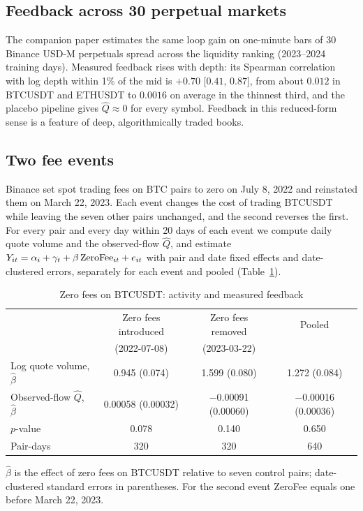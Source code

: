 \documentclass[12pt]{article}
\theoremstyle{definition}
\theoremstyle{remark}
\begin{document}
\subsection{Feedback across 30 perpetual markets}

The companion paper estimates the same loop gain on one-minute bars of 30 Binance USD-M perpetuals spread across the liquidity ranking (2023--2024 training days). Measured feedback rises with depth: its Spearman correlation with log depth within 1\% of the mid is $+0.70$ [$0.41$, $0.87$], from about $0.012$ in BTCUSDT and ETHUSDT to $0.0016$ on average in the thinnest third, and the placebo pipeline gives $\hat Q\approx0$ for every symbol. Feedback in this reduced-form sense is a feature of deep, algorithmically traded books.

\subsection{Two fee events}

Binance set spot trading fees on BTC pairs to zero on July 8, 2022 and reinstated them on March 22, 2023. Each event changes the cost of trading BTCUSDT while leaving the seven other pairs unchanged, and the second reverses the first. For every pair and every day within 20 days of each event we compute daily quote volume and the observed-flow $\hat Q$, and estimate $Y_{it}=\alpha_i+\gamma_t+\beta\,{\rm ZeroFee}_{it}+e_{it}$ with pair and date fixed effects and date-clustered errors, separately for each event and pooled (Table~\ref{tab:fee2}).

\begin{table}[t]\centering\small
\begin{threeparttable}
\caption{Zero fees on BTCUSDT: activity and measured feedback}\label{tab:fee2}
\begin{tabular}{lccc}
\toprule
 & Zero fees introduced & Zero fees removed & Pooled\\
 & (2022-07-08) & (2023-03-22) & \\
\midrule
Log quote volume, $\hat\beta$ & 0.945 (0.074) & 1.599 (0.080) & 1.272 (0.084)\\
Observed-flow $\hat Q$, $\hat\beta$ & 0.00058 (0.00032) & $-$0.00091 (0.00060) & $-$0.00016 (0.00036)\\
\quad $p$-value & 0.078 & 0.140 & 0.650\\
Pair-days & 320 & 320 & 640\\
\bottomrule
\end{tabular}
\begin{tablenotes}\footnotesize\item $\hat\beta$ is the effect of zero fees on BTCUSDT relative to seven control pairs; date-clustered standard errors in parentheses. For the second event ZeroFee equals one before March 22, 2023. \end{tablenotes}
\end{threeparttable}
\end{table}
\end{document}
